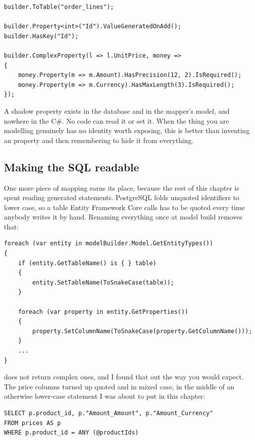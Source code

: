 \begin{verbatim}
builder.ToTable("order_lines");

builder.Property<int>("Id").ValueGeneratedOnAdd();
builder.HasKey("Id");

builder.ComplexProperty(l => l.UnitPrice, money =>
{
    money.Property(m => m.Amount).HasPrecision(12, 2).IsRequired();
    money.Property(m => m.Currency).HasMaxLength(3).IsRequired();
});
\end{verbatim}

A shadow property exists in the database and in the mapper's model, and nowhere
in the C\#. No code can read it or set it. When the thing you are modelling
genuinely has no identity worth exposing, this is better than inventing an
 property and then remembering to hide it from everything.

\subsection*{Making the SQL readable}

%
One more piece of mapping earns its place, because the rest of this chapter is
spent reading generated statements. PostgreSQL folds unquoted identifiers to
lower case, so a table Entity Framework Core calls  has to be
quoted every time anybody writes it by hand. Renaming everything once at model
build removes that:

\begin{verbatim}
foreach (var entity in modelBuilder.Model.GetEntityTypes())
{
    if (entity.GetTableName() is { } table)
    {
        entity.SetTableName(ToSnakeCase(table));
    }

    foreach (var property in entity.GetProperties())
    {
        property.SetColumnName(ToSnakeCase(property.GetColumnName()));
    }
    ...
}
\end{verbatim}

 does not return complex ones, and I found that out the way
you would expect. The price columns turned up quoted and in mixed case, in the
middle of an otherwise lower-case statement I was about to put in this chapter:

\begin{verbatim}
SELECT p.product_id, p."Amount_Amount", p."Amount_Currency"
FROM prices AS p
WHERE p.product_id = ANY (@productIds)
\end{verbatim}


